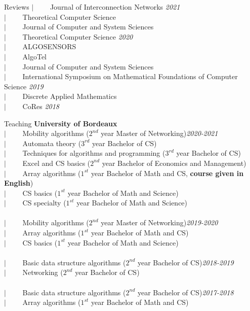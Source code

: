\documentclass[french]{resume} %
\begin{document}
\begin{rSection}{Reviews}
	$| \qquad$ Journal of Interconnection Networks \hfill {\em 2021} \\
	$| \qquad$ Theoretical Computer Science \\
	$| \qquad$ Journal of Computer and System Sciences \\
	$| \qquad$ Theoretical Computer Science \hfill {\em 2020} \\
	$| \qquad$ ALGOSENSORS \\
	$| \qquad$ AlgoTel \\
	$| \qquad$ Journal of Computer and System Sciences\\
	$| \qquad$ International Symposium on Mathematical Foundations of Computer Science \hfill {\em 2019} \\
	$| \qquad$ Discrete Applied Mathematics \\
	$| \qquad$ CoRes \hfill {\em 2018} 
\end{rSection}

\newpage

\begin{rSection}{Teaching}
\textbf{University of Bordeaux} \\
$| \qquad$ Mobility algorithms ($2^{nd}$ year Master of Networking)\hfill {\em 2020-2021}\\
$| \qquad$ Automata theory ($3^{rd}$ year Bachelor of CS)\\
$| \qquad$ Techniques for algorithms and programming ($3^{rd}$ year Bachelor of CS)\\
$| \qquad$ Excel and CS basics ($2^{nd}$ year Bachelor of Economics and Management)\\
$| \qquad$ Array algorithms ($1^{st}$ year Bachelor of Math and CS, \textbf{course given in English})\\
$| \qquad$ CS basics ($1^{st}$ year Bachelor of Math and Science)\\
$| \qquad$ CS specialty ($1^{st}$ year Bachelor of Math and Science)\\
\\
$| \qquad$ Mobility algorithms ($2^{nd}$ year Master of Networking)\hfill {\em 2019-2020}\\
$| \qquad$ Array algorithms ($1^{st}$ year Bachelor of Math and CS)\\
$| \qquad$ CS basics ($1^{st}$ year Bachelor of Math and Science)\\
\\
$| \qquad$ Basic data structure algorithms ($2^{nd}$ year Bachelor of CS)\hfill {\em 2018-2019}\\
$| \qquad$ Networking ($2^{nd}$ year Bachelor of CS)\\
\\
$| \qquad$ Basic data structure algorithms ($2^{nd}$ year Bachelor of CS)\hfill {\em 2017-2018}\\
$| \qquad$ Array algorithms ($1^{st}$ year Bachelor of Math and CS)
\end{rSection}
\end{document}
